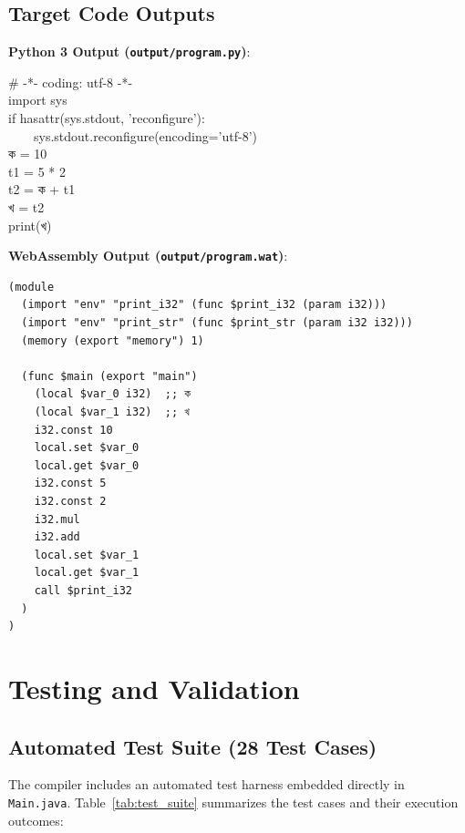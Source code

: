 \documentclass[12pt, a4paper]{report}
\begin{document}
\section{Target Code Outputs}

\noindent\textbf{Python 3 Output (\texttt{output/program.py})}:

\begin{tcolorbox}[colback=codegray,colframe=black!20,arc=0mm,boxrule=0.5pt,left=10pt,right=10pt,top=3pt,bottom=3pt,before=\vspace{1pt},after=\vspace{3pt}]
\ttfamily\small
\# -*- coding: utf-8 -*-\\
import sys\\
if hasattr(sys.stdout, 'reconfigure'):\\
\mbox{}~~~~sys.stdout.reconfigure(encoding='utf-8')\\
ক = 10\\
t1 = 5 * 2\\
t2 = ক + t1\\
খ = t2\\
print(খ)
\end{tcolorbox}

\par\vspace{2pt}
\noindent\textbf{WebAssembly Output (\texttt{output/program.wat})}:

\begin{lstlisting}[basicstyle=\ttfamily\footnotesize, aboveskip=2pt, belowskip=2pt]
(module
  (import "env" "print_i32" (func $print_i32 (param i32)))
  (import "env" "print_str" (func $print_str (param i32 i32)))
  (memory (export "memory") 1)

  (func $main (export "main")
    (local $var_0 i32)  ;; ক
    (local $var_1 i32)  ;; খ
    i32.const 10
    local.set $var_0
    local.get $var_0
    i32.const 5
    i32.const 2
    i32.mul
    i32.add
    local.set $var_1
    local.get $var_1
    call $print_i32
  )
)
\end{lstlisting}

\chapter{Testing and Validation}

\section{Automated Test Suite (28 Test Cases)}
The compiler includes an automated test harness embedded directly in \texttt{Main.java}. Table~\ref{tab:test_suite} summarizes the test cases and their execution outcomes:
\end{document}
